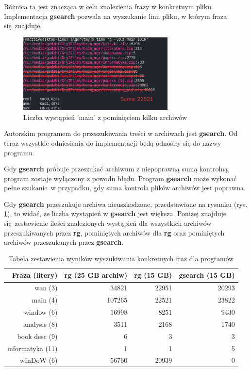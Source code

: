 Różnica ta jest znacząca w celu znalezienia frazy w konkretnym pliku. 
Implementacja \textbf{gsearch} pozwala na wyszukanie linii pliku, w którym fraza się znajduje. 

\begin{figure}[htbp]
\centering
\includegraphics[width=0.7\textwidth]{./images/rgSkippedmain.png}
\caption{Liczba wystąpień 'main' z pominięciem kilku archiwów}
\label{fig:ripgrepRemoveSkipped}
\end{figure}

Autorskim programem do przeszukiwania treści w archiwach jest \textbf{gsearch}. Od teraz
wszystkie odniesienia do implementacji będą odnosiły się do nazwy programu.

Gdy \textbf{gsearch} próbuje przeszukać archiwum z niepoprawną sumą kontrolną, program
zostaje wyłączony z powodu błędu. Program \textbf{gsearch} może wykonać pełne szukanie w przypadku,
gdy suma kontrola plików archiwów jest poprawna.

Gdy \textbf{gsearch} przeszukuje archiwa nieuszkodzone, przedstawione na rysunku (rys. \ref{fig:ripgrepRemoveSkipped}),
to widać, że liczba wystąpień w \textbf{gsearch} jest większa. Poniżej znajduje się zestawienie
ilości znalezionych wystąpień dla wszystkich archiwów przeszukiwanych przez \textbf{rg},
pominiętych archiwów dla \textbf{rg} oraz pominiętych archiwów przeszukanych przez \textbf{gsearch}.

\begin{table}[htbp]
    \centering
    \begin{tabular}{|r|r|r|r|}
        \hline
        \textbf{Fraza (litery)} & \textbf{rg (25 GB archiw)} & \textbf{rg (15 GB)} &  \textbf{gsearch (15 GB)} \\
        \hline
        wan (3) & 34821 & 22951 & 20293 \\
        \hline
        main (4) & 107265 & 22521 & 23822 \\
        \hline
        window (6) & 16998 & 8251 & 9430 \\
        \hline
        analysis (8) & 3511 & 2168 & 1740 \\
        \hline
        book desc (9) & 6 & 3 & 3 \\
        \hline
        informatyka (11) & 1 & 1 & 5 \\
        \hline
        wInDoW (6) & 56760 & 20939 & 0 \\
        \hline
    \end{tabular}
    \caption{Tabela zestawienia wyników wyszukiwania konkretnych fraz dla programów}
    \label{tabela:iloscWyszukanDziekiProgramom}
\end{table}

